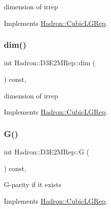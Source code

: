 dimension of irrep 

Implements \mbox{\hyperlink{structHadron_1_1CubicLGRep_a3acbaea26503ed64f20df693a48e4cdd}{Hadron\+::\+Cubic\+L\+G\+Rep}}.

\mbox{\label{structHadron_1_1D3E2MRep_a73c88cd77967138738e5b0bcdda21ab9}} 
\subsubsection{\texorpdfstring{dim()}{dim()}\hspace{0.1cm}{\footnotesize\ttfamily [2/2]}}
{\footnotesize\ttfamily int Hadron\+::\+D3\+E2\+M\+Rep\+::dim (\begin{DoxyParamCaption}{ }\end{DoxyParamCaption}) const\hspace{0.3cm}{\ttfamily [inline]}, {\ttfamily [virtual]}}

dimension of irrep 

Implements \mbox{\hyperlink{structHadron_1_1CubicLGRep_a3acbaea26503ed64f20df693a48e4cdd}{Hadron\+::\+Cubic\+L\+G\+Rep}}.

\mbox{\label{structHadron_1_1D3E2MRep_a5df809ae715e45d60cef8bc3cfb4d567}} 
\subsubsection{\texorpdfstring{G()}{G()}\hspace{0.1cm}{\footnotesize\ttfamily [1/2]}}
{\footnotesize\ttfamily int Hadron\+::\+D3\+E2\+M\+Rep\+::G (\begin{DoxyParamCaption}{ }\end{DoxyParamCaption}) const\hspace{0.3cm}{\ttfamily [inline]}, {\ttfamily [virtual]}}

G-\/parity if it exists 

Implements \mbox{\hyperlink{structHadron_1_1CubicLGRep_ace26f7b2d55e3a668a14cb9026da5231}{Hadron\+::\+Cubic\+L\+G\+Rep}}.

\mbox{\label{structHadron_1_1D3E2MRep_a5df809ae715e45d60cef8bc3cfb4d567}} 
